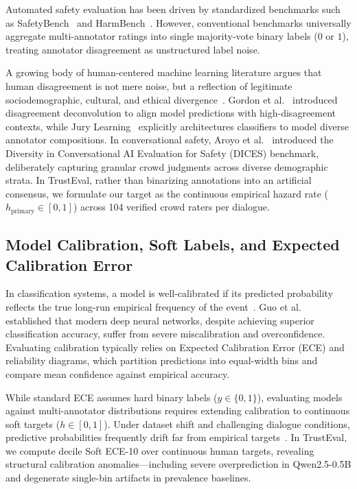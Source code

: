 Automated safety evaluation has been driven by standardized benchmarks such as SafetyBench~\cite{zhang2024safetybench} and HarmBench~\cite{mazeika2024harmbench}. However, conventional benchmarks universally aggregate multi-annotator ratings into single majority-vote binary labels ($0$ or $1$), treating annotator disagreement as unstructured label noise.

A growing body of human-centered machine learning literature argues that human disagreement is not mere noise, but a reflection of legitimate sociodemographic, cultural, and ethical divergence~\cite{basile2021we,davani2022dealing,rottger2022two}. Gordon et al.~\cite{gordon2021disagreement} introduced disagreement deconvolution to align model predictions with high-disagreement contexts, while Jury Learning~\cite{gordon2022jury} explicitly architectures classifiers to model diverse annotator compositions. In conversational safety, Aroyo et al.~\cite{aroyo2023dices} introduced the Diversity in Conversational AI Evaluation for Safety (DICES) benchmark, deliberately capturing granular crowd judgments across diverse demographic strata. In TrustEval, rather than binarizing annotations into an artificial consensus, we formulate our target as the continuous empirical hazard rate ($h_{\text{primary}} \in [0, 1]$) across 104 verified crowd raters per dialogue.

\subsection{Model Calibration, Soft Labels, and Expected Calibration Error}
\label{sec:rel_calibration}

In classification systems, a model is well-calibrated if its predicted probability reflects the true long-run empirical frequency of the event~\cite{brier1950verification}. Guo et al.~\cite{guo2017calibration} established that modern deep neural networks, despite achieving superior classification accuracy, suffer from severe miscalibration and overconfidence. Evaluating calibration typically relies on Expected Calibration Error (ECE) and reliability diagrams, which partition predictions into equal-width bins and compare mean confidence against empirical accuracy.

While standard ECE assumes hard binary labels ($y \in \{0, 1\}$), evaluating models against multi-annotator distributions requires extending calibration to continuous soft targets ($h \in [0, 1]$). Under dataset shift and challenging dialogue conditions, predictive probabilities frequently drift far from empirical targets~\cite{ovadia2019can}. In TrustEval, we compute decile Soft ECE-10 over continuous human targets, revealing structural calibration anomalies—including severe overprediction in Qwen2.5-0.5B and degenerate single-bin artifacts in prevalence baselines.

